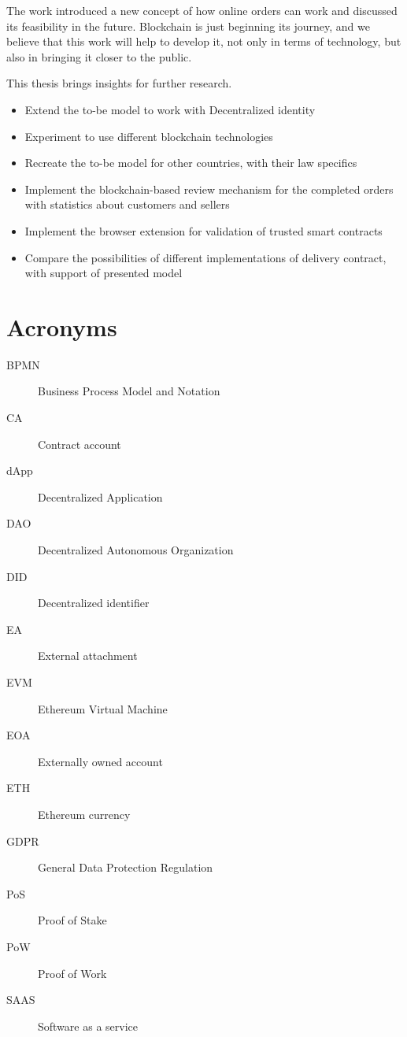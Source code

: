 \documentclass[thesis=M,english]{FITthesis}[2019/12/23]
\begin{document}
The work introduced a new concept of how online orders can work and discussed its feasibility in the future. Blockchain is just beginning its journey, and we believe that this work will help to develop it, not only in terms of technology, but also in bringing it closer to the public.

This thesis brings insights for further research.

\begin{itemize}
\item Extend the to-be model to work with Decentralized identity
\item Experiment to use different blockchain technologies
\item Recreate the to-be model for other countries, with their law specifics
\item Implement the blockchain-based review mechanism for the completed orders with statistics about customers and sellers
\item Implement the browser extension for validation of trusted smart contracts
\item Compare the possibilities of different implementations of delivery contract, with support of presented model
\end{itemize}




%
%

\printbibliography


\appendix

\chapter{Acronyms}
\begin{description}
    \item[BPMN] Business Process Model and Notation
    \item[CA]   Contract account
    \item[dApp] Decentralized Application
    \item[DAO]  Decentralized Autonomous Organization
    \item[DID]  Decentralized identifier
    \item[EA]  External attachment
    \item[EVM]  Ethereum Virtual Machine
    \item[EOA]  Externally owned account
    \item[ETH]  Ethereum currency
    \item[GDPR] General Data Protection Regulation
	\item[PoS]  Proof of Stake
	\item[PoW]  Proof of Work
    \item[SAAS] Software as a service
\end{description}
\end{document}
